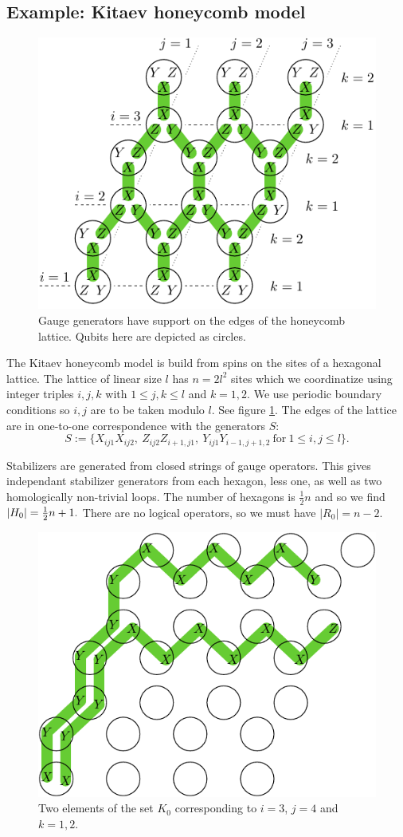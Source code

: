 \documentclass[12pt,notitlepage,longbibliography,nofootinbib,tightenlines]{revtex4}
\begin{document}
\subsection{Example: Kitaev honeycomb model}


\begin{figure}[th!]
\begin{center}
        \includegraphics[width=0.6\columnwidth]{fig_00.pdf}
\caption{
Gauge generators have support on the edges of the honeycomb lattice.
Qubits here are depicted as circles.
}
\label{honeycomb}
\end{center}
\end{figure}


The Kitaev honeycomb model is build from spins on
the sites of a hexagonal lattice. 
The lattice of linear size $l$ has $n=2l^2$ sites
which we coordinatize using integer triples $i, j, k$
with $1\le j, k\le l$ and $k=1, 2.$
We use periodic boundary conditions so $i, j$ are
to be taken modulo $l$.
See figure \ref{honeycomb}.
The edges of the lattice are in one-to-one
correspondence with the generators $S$:
$$
S := \big\{X_{ij1}X_{ij2},\ Z_{ij2}Z_{i+1,j1},\ Y_{ij1}Y_{i-1,j+1,2}
\ \mbox{for}\ 1\le i,j\le l\big\}.
$$

Stabilizers are generated from closed strings of
gauge operators. This gives independant stabilizer generators
from each hexagon, less one, as well as two
homologically non-trivial loops.
The number of hexagons is $\frac{1}{2}n$ and
so we find $|H_0|=\frac{1}{2} n+1.$
There are no logical operators, so we
must have $|R_0|=n-2.$

\begin{figure}[th!]
\begin{center}
        \includegraphics[width=0.5\columnwidth]{fig_01.pdf}
\caption{Two elements of the set $K_0$ corresponding
to $i=3$, $j=4$ and $k=1,2.$}
\label{jaws}
\end{center}
\end{figure}
\end{document}
